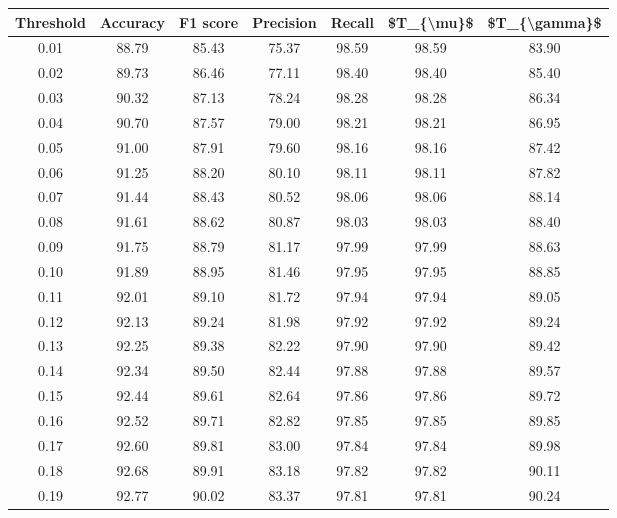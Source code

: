 \begin{tabular}{|c|c|c|c|c|c|c|}
\hline
 Threshold &  Accuracy &  F1 score &  Precision &  Recall &  \$T\_\{\textbackslash mu\}\$ &  \$T\_\{\textbackslash gamma\}\$ \\
\hline
      0.01 &     88.79 &     85.43 &      75.37 &   98.59 &      98.59 &         83.90 \\
      0.02 &     89.73 &     86.46 &      77.11 &   98.40 &      98.40 &         85.40 \\
      0.03 &     90.32 &     87.13 &      78.24 &   98.28 &      98.28 &         86.34 \\
      0.04 &     90.70 &     87.57 &      79.00 &   98.21 &      98.21 &         86.95 \\
      0.05 &     91.00 &     87.91 &      79.60 &   98.16 &      98.16 &         87.42 \\
      0.06 &     91.25 &     88.20 &      80.10 &   98.11 &      98.11 &         87.82 \\
      0.07 &     91.44 &     88.43 &      80.52 &   98.06 &      98.06 &         88.14 \\
      0.08 &     91.61 &     88.62 &      80.87 &   98.03 &      98.03 &         88.40 \\
      0.09 &     91.75 &     88.79 &      81.17 &   97.99 &      97.99 &         88.63 \\
      0.10 &     91.89 &     88.95 &      81.46 &   97.95 &      97.95 &         88.85 \\
      0.11 &     92.01 &     89.10 &      81.72 &   97.94 &      97.94 &         89.05 \\
      0.12 &     92.13 &     89.24 &      81.98 &   97.92 &      97.92 &         89.24 \\
      0.13 &     92.25 &     89.38 &      82.22 &   97.90 &      97.90 &         89.42 \\
      0.14 &     92.34 &     89.50 &      82.44 &   97.88 &      97.88 &         89.57 \\
      0.15 &     92.44 &     89.61 &      82.64 &   97.86 &      97.86 &         89.72 \\
      0.16 &     92.52 &     89.71 &      82.82 &   97.85 &      97.85 &         89.85 \\
      0.17 &     92.60 &     89.81 &      83.00 &   97.84 &      97.84 &         89.98 \\
      0.18 &     92.68 &     89.91 &      83.18 &   97.82 &      97.82 &         90.11 \\
      0.19 &     92.77 &     90.02 &      83.37 &   97.81 &      97.81 &         90.24 \\

\end{tabular}
